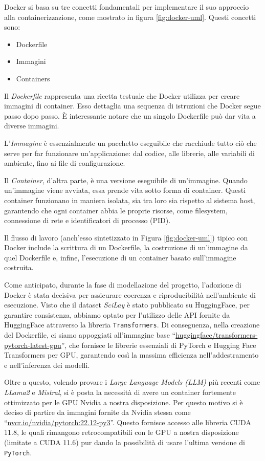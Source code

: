 \documentclass[12pt,a4paper,twoside,openright]{book}
\begin{document}
Docker si basa su tre concetti fondamentali per implementare il suo approccio alla containerizzazione, come mostrato in figura \ref{fig:docker-uml}. Questi concetti sono:
\begin{itemize}
    \item Dockerfile
    \item Immagini
    \item Containers
\end{itemize}
Il \emph{Dockerfile} rappresenta una ricetta testuale che Docker utilizza per creare immagini di container. Esso dettaglia una sequenza di istruzioni che Docker segue passo dopo passo. È interessante notare che un singolo Dockerfile può dar vita a diverse immagini.

L'\emph{Immagine} è essenzialmente un pacchetto eseguibile che racchiude tutto ciò che serve per far funzionare un'applicazione: dal codice, alle librerie, alle variabili di ambiente, fino ai file di configurazione.

Il \emph{Container}, d'altra parte, è una versione eseguibile di un'immagine. Quando un'immagine viene avviata, essa prende vita sotto forma di container. Questi container funzionano in maniera isolata, sia tra loro sia rispetto al sistema host, garantendo che ogni container abbia le proprie risorse, come filesystem, connessione di rete e identificatori di processo (PID).

Il flusso di lavoro (anch'esso sintetizzato in Figura \ref{fig:docker-uml}) tipico con Docker include la scrittura di un Dockerfile, la costruzione di un'immagine da quel Dockerfile e, infine, l'esecuzione di un container basato sull'immagine costruita.

Come anticipato, durante la fase di modellazione del progetto, l'adozione di Docker è stata decisiva per assicurare coerenza e riproducibilità nell'ambiente di esecuzione. 
Visto che il dataset \emph{SciLay} è stato pubblicato su HuggingFace, per garantire consistenza, abbiamo optato per l'utilizzo delle API fornite da HuggingFace attraverso la libreria \texttt{Transformers}. Di conseguenza, nella creazione del Dockerfile, ci siamo appoggiati all'immagine base ``\href{https://hub.docker.com/r/huggingface/transformers-pytorch-gpu/}{huggingface/transformers-pytorch-latest-gpu}'', che fornisce le librerie essenziali di PyTorch e Hugging Face Transformers per GPU, garantendo così la massima efficienza nell'addestramento e nell'inferenza dei modelli.

Oltre a questo, volendo provare i \emph{Large Language Models (LLM)} più recenti come \emph{LLama2} e \emph{Mistral}, si è posta la necessità di avere un container fortemente ottimizzato per le GPU Nvidia a nostra disposizione. Per questo motivo si è deciso di partire da immagini fornite da Nvidia stessa come ``\href{https://docs.nvidia.com/deeplearning/frameworks/pytorch-release-notes/rel-22-12.html}{nvcr.io/nvidia/pytorch:22.12-py3}''. Questo fornisce accesso alle libreria CUDA 11.8, le quali rimangono retrocompatibili con le GPU a nostra disposizione (limitate a CUDA 11.6) pur dando la possibilità di usare l'ultima versione di \texttt{PyTorch}.
\end{document}
